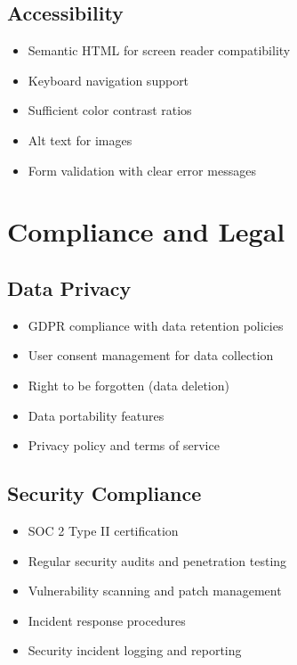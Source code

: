\documentclass[12pt,a4paper]{report}
\begin{document}
\subsection{Accessibility}

\begin{itemize}[label=\textbullet]
    \item Semantic HTML for screen reader compatibility
    \item Keyboard navigation support
    \item Sufficient color contrast ratios
    \item Alt text for images
    \item Form validation with clear error messages
\end{itemize}

\section{Compliance and Legal}

\subsection{Data Privacy}

\begin{itemize}[label=\textbullet]
    \item GDPR compliance with data retention policies
    \item User consent management for data collection
    \item Right to be forgotten (data deletion)
    \item Data portability features
    \item Privacy policy and terms of service
\end{itemize}

\subsection{Security Compliance}

\begin{itemize}[label=\textbullet]
    \item SOC 2 Type II certification
    \item Regular security audits and penetration testing
    \item Vulnerability scanning and patch management
    \item Incident response procedures
    \item Security incident logging and reporting
\end{itemize}
\end{document}
